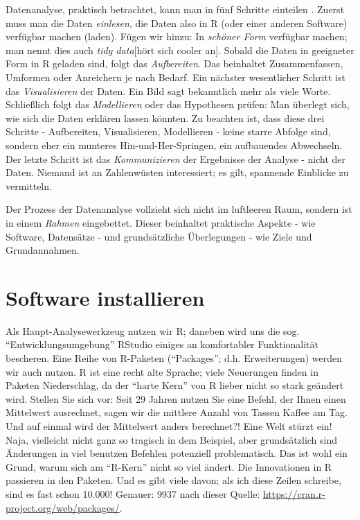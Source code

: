 \documentclass[12pt,ngerman,]{book}
\begin{document}
Datenanalyse, praktisch betrachtet, kann man in fünf Schritte einteilen
\citep{r4ds}. Zuerst muss man die Daten \emph{einlesen}, die Daten also
in R (oder einer anderen Software) verfügbar machen (laden). Fügen wir
hinzu: In \emph{schöner Form} verfügbar machen; man nennt dies auch
\emph{tidy data}{[}hört sich cooler an{]}. Sobald die Daten in
geeigneter Form in R geladen sind, folgt das \emph{Aufbereiten}. Das
beinhaltet Zusammenfassen, Umformen oder Anreichern je nach Bedarf. Ein
nächster wesentlicher Schritt ist das \emph{Visualisieren} der Daten.
Ein Bild sagt bekanntlich mehr als viele Worte. Schließlich folgt das
\emph{Modellieren} oder das Hypothesen prüfen: Man überlegt sich, wie
sich die Daten erklären lassen könnten. Zu beachten ist, dass diese drei
Schritte - Aufbereiten, Visualisieren, Modellieren - keine starre
Abfolge sind, sondern eher ein munteres Hin-und-Her-Springen, ein
aufbauendes Abwechseln. Der letzte Schritt ist das \emph{Kommunizieren}
der Ergebnisse der Analyse - nicht der Daten. Niemand ist an
Zahlenwüsten interessiert; es gilt, spannende Einblicke zu vermitteln.

Der Prozess der Datenanalyse vollzieht sich nicht im luftleeren Raum,
sondern ist in einem \emph{Rahmen} eingebettet. Dieser beinhaltet
praktische Aspekte - wie Software, Datensätze - und grundsätzliche
Überlegungen - wie Ziele und Grundannahmen.

\section{Software installieren}\label{software-installieren}

Als Haupt-Analysewerkzeug nutzen wir R; daneben wird uns die sog.
``Entwicklungsumgebung'' RStudio einiges an komfortabler Funktionalität
bescheren. Eine Reihe von R-Paketen (``Packages''; d.h. Erweiterungen)
werden wir auch nutzen. R ist eine recht alte Sprache; viele Neuerungen
finden in Paketen Niederschlag, da der ``harte Kern'' von R lieber nicht
so stark geändert wird. Stellen Sie sich vor: Seit 29 Jahren nutzen Sie
eine Befehl, der Ihnen einen Mittelwert ausrechnet, sagen wir die
mittlere Anzahl von Tassen Kaffee am Tag. Und auf einmal wird der
Mittelwert anders berechnet?! Eine Welt stürzt ein! Naja, vielleicht
nicht ganz so tragisch in dem Beispiel, aber grundsätzlich sind
Änderungen in viel benutzen Befehlen potenziell problematisch. Das ist
wohl ein Grund, warum sich am ``R-Kern'' nicht so viel ändert. Die
Innovationen in R passieren in den Paketen. Und es gibt viele davon; als
ich diese Zeilen schreibe, sind es fast schon 10.000! Genauer: 9937 nach
dieser Quelle: \url{https://cran.r-project.org/web/packages/}.
\end{document}
